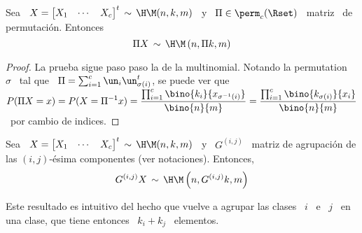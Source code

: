 \begin{lema}\label{Lem:MP:PermutacionHipergeomMulti}
%
  Sea  \ $X =  \begin{bmatrix} X_1  & \cdots  & X_c  \end{bmatrix}^t \,  \sim \,
  \H\M(n,k,m)$  \   y  \   $\Pi  \in  \perm_c(\Rset)$   \  matriz   \  de
  permutaci\'on. Entonces
  \[
  \Pi X \, \sim \, \H\M\left( n ,  \Pi k , m \right)
  \]
\end{lema}
%
\begin{proof}
  La  prueba sigue  paso paso  la de  la multinomial.  Notando la  permutation \
  $\sigma$ \  tal que \ $\Pi  = \sum_{i=1}^c \un_i  \un_{\sigma(i)}^t$, se puede
  ver   que  \  $\displaystyle   P(\Pi  X   =  x)   =  P(X   =  \Pi^{-1}   x)  =
  \frac{\prod_{i=1}^c       \bino{k_i}{x_{\sigma^{-1}(i)}}}{\bino{n}{m}}       =
  \frac{\prod_{i=1}^c \bino{k_{\sigma(i)}}{x_i}}{\bino{n}{m}} $  \ por cambio de
  indices.
\end{proof}
%
\begin{lema}\label{Lem:MP:StabAgregacionHipergeomMulti}
%
  Sea  \ $X =  \begin{bmatrix} X_1  & \cdots  & X_c  \end{bmatrix}^t \,  \sim \,
  \H\M(n,k,m)$ \ y \ $G^{(i,j)}$ \ matriz de agrupaci\'on de las $(i,j)$-\'esima
  componentes (ver notaciones). Entonces,
  \[
  G^{(i,j)} X \, \sim \, \H\M\left( n , G^{(i,j)} k , m \right)  
  \]
\end{lema}
%
Este resultado es intuitivo del hecho que  vuelve a agrupar las clases \ $i$ \ e
\ $j$ \ en una clase, que tiene entonces \ $k_i + k_j$ \ elementos.
%

